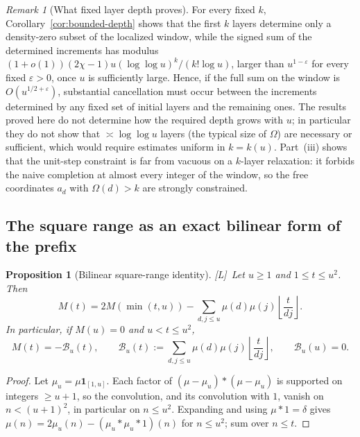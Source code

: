 \documentclass[11pt]{amsart}
\numberwithin{equation}{section}
\theoremstyle{plain}
\newtheorem{proposition}[theorem]{Proposition}
\theoremstyle{definition}
\theoremstyle{remark}
\newtheorem{remark}[theorem]{Remark}
\newcommand{\eps}{\varepsilon}
\newcommand{\tagL}{\textup{[L]}}
\begin{document}
\begin{remark}[What fixed layer depth proves]
\label{rem:depth-content}
For every fixed $k$, Corollary~\ref{cor:bounded-depth} shows that the first
$k$ layers determine only a density-zero subset of the localized window,
while the signed sum of the determined increments has modulus
$(1+o(1))(2\chi-1)u(\log\log u)^k/(k!\log u)$, larger than $u^{1-\eps}$ for every fixed $\eps>0$, once $u$ is sufficiently large. Hence, if the full sum on the window is
$O(u^{1/2+\eps})$, substantial cancellation must occur between the
increments determined by any fixed set of initial layers and the remaining
ones. The results proved here do not determine how the required depth grows
with $u$; in particular they do not show that $\asymp\log\log u$ layers
(the typical size of $\Omega$) are necessary or sufficient, which would
require estimates uniform in $k=k(u)$. Part~(iii) shows that the unit-step
constraint is far from vacuous on a $k$-layer relaxation: it forbids the
naive completion at almost every integer of the window, so the free
coordinates $a_d$ with $\Omega(d)>k$ are strongly constrained.
\end{remark}



\subsection{The square range as an exact bilinear form of the prefix}

\begin{proposition}[Bilinear square-range identity]
\label{prop:prefix-bilinear}
\tagL\ Let $u\ge1$ and $1\le t\le u^2$. Then
\begin{equation}
\label{eq:bilinear-general}
M(t)=2M(\min(t,u))-
\sum_{d,j\le u}\mu(d)\mu(j)\left\lfloor\frac{t}{dj}\right\rfloor.
\end{equation}
In particular, if $M(u)=0$ and $u<t\le u^2$,
\begin{equation}
\label{eq:bilinear-excursion}
M(t)=-\mathcal B_u(t),\qquad
\mathcal B_u(t):=\sum_{d,j\le u}\mu(d)\mu(j)
\left\lfloor\frac{t}{dj}\right\rfloor,
\qquad \mathcal B_u(u)=0.
\end{equation}
\end{proposition}

\begin{proof}
Let $\mu_u=\mu\mathbf1_{[1,u]}$. Each factor of $(\mu-\mu_u)*(\mu-\mu_u)$ is
supported on integers $\ge u+1$, so the convolution, and its convolution
with $1$, vanish on $n<(u+1)^2$, in particular on $n\le u^2$. Expanding and using $\mu*1=\delta$ gives
$\mu(n)=2\mu_u(n)-(\mu_u*\mu_u*1)(n)$ for $n\le u^2$; sum over $n\le t$.
\end{proof}
\end{document}
